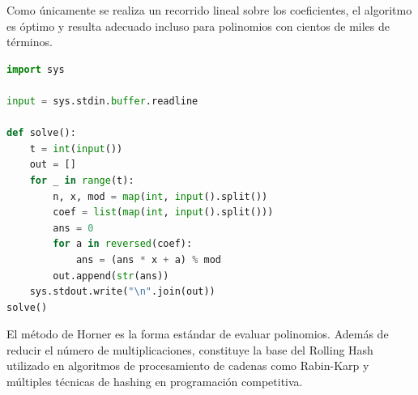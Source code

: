 Como únicamente se realiza un recorrido lineal sobre los coeficientes, el algoritmo es óptimo y resulta adecuado incluso para polinomios con cientos de miles de términos.


\begin{lstlisting}[language=Python]
import sys

input = sys.stdin.buffer.readline

def solve():
    t = int(input())
    out = []
    for _ in range(t):
        n, x, mod = map(int, input().split())
        coef = list(map(int, input().split()))
        ans = 0
        for a in reversed(coef):
            ans = (ans * x + a) % mod
        out.append(str(ans))
    sys.stdout.write("\n".join(out))
solve()
\end{lstlisting}


El método de Horner es la forma estándar de evaluar polinomios. Además de reducir el número de multiplicaciones, constituye la base del Rolling Hash utilizado en algoritmos de procesamiento de cadenas como Rabin-Karp y múltiples técnicas de hashing en programación competitiva.